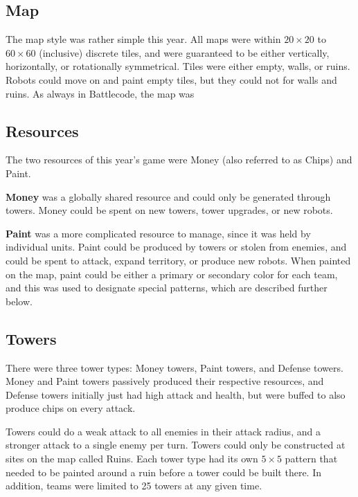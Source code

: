 \documentclass{article}
\begin{document}
  \subsection{Map}

  The map style was rather simple this year. All maps were within $20 \times 20$ to $60 \times 60$ (inclusive) discrete tiles, and were guaranteed to be either vertically, horizontally, or rotationally symmetrical. Tiles were either empty, walls, or ruins. Robots could move on and paint empty tiles, but they could not for walls and ruins. As always in Battlecode, the map was 

  \subsection{Resources}

  The two resources of this year's game were Money (also referred to as Chips) and Paint.
  
  \medskip

  \textbf{Money} was a globally shared resource and could only be generated through towers. Money could be spent on new towers, tower upgrades, or new robots.
  
  \medskip

  \textbf{Paint} was a more complicated resource to manage, since it was held by individual units. Paint could be produced by towers or stolen from enemies, and could be spent to attack, expand territory, or produce new robots. When painted on the map, paint could be either a primary or secondary color for each team, and this was used to designate special patterns, which are described further below.

  \subsection{Towers}

  There were three tower types: Money towers, Paint towers, and Defense towers. Money and Paint towers passively produced their respective resources, and Defense towers initially just had high attack and health, but were buffed to also produce chips on every attack.

  \medskip

  Towers could do a weak attack to all enemies in their attack radius, and a stronger attack to a single enemy per turn. Towers could only be constructed at sites on the map called Ruins. Each tower type had its own $5 \times 5$ pattern that needed to be painted around a ruin before a tower could be built there. In addition, teams were limited to 25 towers at any given time.
\end{document}
